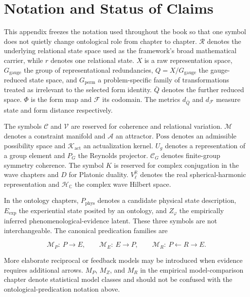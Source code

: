 \chapter{Notation and Status of Claims}

This appendix freezes the notation used throughout the book so that one symbol does not quietly change ontological role from chapter to chapter. $\mathscr R$ denotes the underlying relational state space used as the framework's broad mathematical carrier, while $r$ denotes one relational state. $X$ is a raw representation space, $G_{\mathrm{gauge}}$ the group of representational redundancies, $Q=X/G_{\mathrm{gauge}}$ the gauge-reduced state space, and $G_{\mathrm{perm}}$ a problem-specific family of transformations treated as irrelevant to the selected form identity. $\bar Q$ denotes the further reduced space. $\Phi$ is the form map and $\mathcal F$ its codomain. The metrics $d_{\bar Q}$ and $d_{\mathcal F}$ measure state and form distance respectively.

The symbols $\mathscr C$ and $\mathscr V$ are reserved for coherence and relational variation. $\mathcal M$ denotes a constraint manifold and $\mathcal A$ an attractor. $\mathrm{Poss}$ denotes an admissible possibility space and $\mathcal K_{\mathrm{act}}$ an actualization kernel. $U_g$ denotes a representation of a group element and $P_G$ the Reynolds projector. $\mathscr C_G$ denotes finite-group symmetry coherence. The symbol $K$ is reserved for complex conjugation in the wave chapters and $D$ for Platonic duality. $V_\ell^{\mathbb R}$ denotes the real spherical-harmonic representation and $\mathcal H_{\mathbb C}$ the complex wave Hilbert space.

In the ontology chapters, $P_{\mathrm{phys}}$ denotes a candidate physical state description, $E_{\mathrm{exp}}$ the experiential state posited by an ontology, and $Z_\varphi$ the empirically inferred phenomenological-evidence latent. These three symbols are not interchangeable. The canonical predication families are

\[
\mathcal M_P:\ P\longrightarrow E,
\qquad
\mathcal M_E:\ E\longrightarrow P,
\qquad
\mathcal M_R:\ P\longleftarrow R\longrightarrow E.
\]

More elaborate reciprocal or feedback models may be introduced when evidence requires additional arrows. $M_P$, $M_Z$, and $M_R$ in the empirical model-comparison chapter denote statistical model classes and should not be confused with the ontological-predication notation above.

